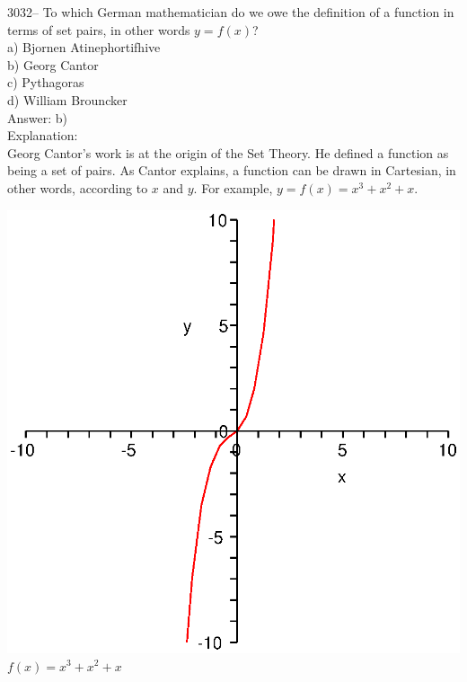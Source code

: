 \documentclass[letterpaper, 12pt]{article}
\begin{document}
3032-- To which German mathematician do we owe the definition of a function in terms of set pairs, in other words $y = f(x)$?\\

a) Bjornen Atinephortifhive\\
b) Georg Cantor\\
c) Pythagoras\\
d) William Brouncker\\

Answer: b)\\

Explanation:\\
Georg Cantor's work is at the origin of the Set Theory. He defined a function as being a set of pairs. As Cantor explains, a function can be drawn in Cartesian, in other words, according to $x$ and $y$. For example, $y = f(x) = x^{3} + x^{2} + x$.
\begin{center}
\includegraphics[scale=0.5]{fonction.eps}\\
$f(x) = x^{3} + x^{2} + x$\\
\end{center}
\end{document}
